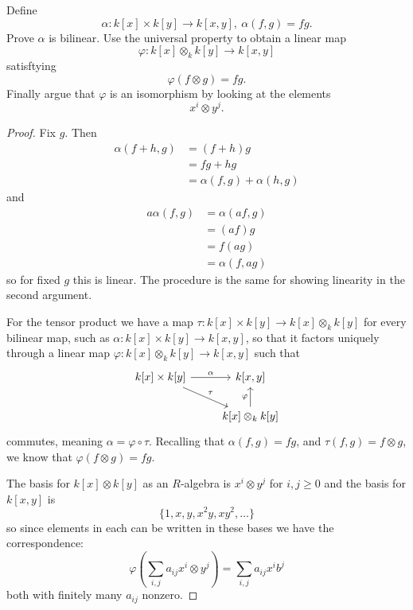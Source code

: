 \documentclass[11pt]{article}
\begin{document}
\begin{prob}
    Define 
    \[
        \alpha : k[x] \times k[y] 
        \to k[x,y], \ 
        \alpha(f,g) = fg. 
    \]
    Prove $\alpha$ is bilinear. Use the universal 
    property to obtain 
    a linear map 
    \[
        \varphi : k[x] \otimes_k k[y] 
        \to k[x,y]
    \]
    satisftying 
    \[
        \varphi(f \otimes g) = fg. 
    \]
    Finally argue that $\varphi$ is 
    an isomorphism by looking at the elements 
    \[
        x^i \otimes y^j. 
    \]
\end{prob}
\begin{proof}
    Fix $g$. Then 
    \begin{align*}
        \alpha(f+h,g) 
        &= (f+h)g \\ 
        &= fg + hg \\ 
        &= \alpha(f,g) + \alpha(h,g)  
    \end{align*}
    and 
    \begin{align*}
        a\alpha(f,g) 
        &= 
        \alpha(af,g) \\   
        &= (af)g \\ 
        &= f(ag) \\ 
        &= \alpha(f,ag) 
    \end{align*}
    so for fixed $g$ this is linear. 
    The procedure is the same for 
    showing linearity in the second argument. 

    For the tensor product we have a map 
    $\tau : k[x] \times k[y] \to k[x] \otimes_k 
    k[y]$ 
    for every bilinear map, such as $\alpha : 
    k[x] \times k[y] \to k[x,y]$, so that it factors uniquely 
    through a linear map 
    $\varphi : k[x] \otimes_k k[y] \to k[x,y]$ 
    such that 
    \[
        \begin{tikzcd}
            k[x] \times k[y] \arrow[r, "\alpha"]
            \arrow[dr, "\tau"] & 
            k[x,y] \\ 
            & k[x] \otimes_k k[y] \arrow[u, "\varphi"]
        \end{tikzcd}
    \] 
    commutes, meaning 
    $\alpha = \varphi \circ \tau$. Recalling that 
    $\alpha(f,g) = fg$, and 
    $\tau(f,g) = f \otimes g$, we know that 
    $\varphi(f \otimes g) = fg$. 

    The basis for $k[x] \otimes k[y]$ as an 
    $R$-algebra is $x^i \otimes y^j$ for $i,j \geq 0$ 
    and the basis for $k[x,y]$ is 
    \[
        \{1, x, y, x^2y, xy^2, \ldots\}
    \]
    so since elements in each 
    can be written in these bases we have the 
    correspondence: 
    \[
        \varphi\left(\sum_{i,j} 
        a_{ij} x^i \otimes y^j\right) 
        = \sum_{i,j} a_{ij}x^ib^j 
    \]
    both with finitely many $a_{ij}$ nonzero. 
\end{proof}
\end{document}
